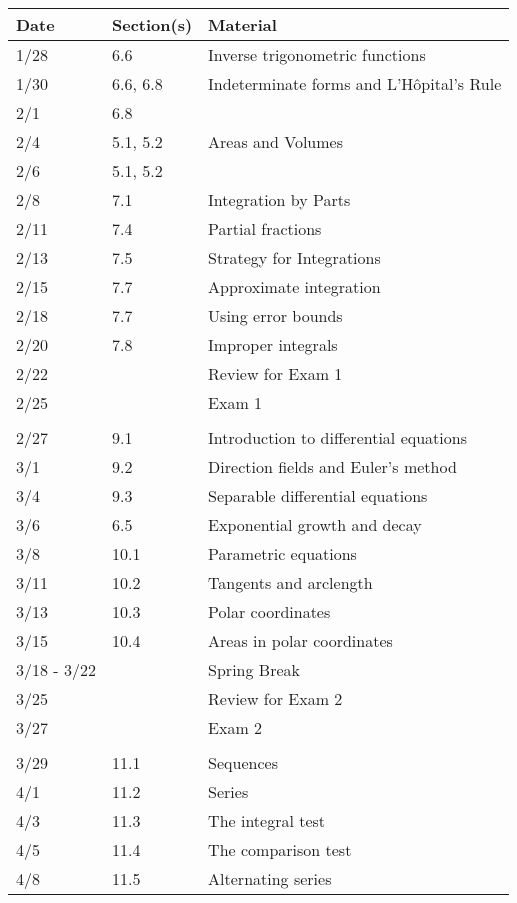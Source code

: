 \begin{center}
  \begin{longtable}{lll}
    Date & Section(s) & Material\\
    \hline
    1/28 & 6.6 & Inverse trigonometric functions\\
    1/30 & 6.6, 6.8 & Indeterminate forms and L'H\^opital's Rule\\
    2/1 & 6.8\\
    2/4 & 5.1, 5.2 & Areas and Volumes\\
    2/6 & 5.1, 5.2\\
    2/8 & 7.1 & Integration by Parts\\
    2/11 & 7.4 & Partial fractions\\
    2/13 & 7.5 & Strategy for Integrations\\
    2/15 & 7.7 & Approximate integration\\
    2/18 & 7.7 & Using error bounds\\
    2/20 & 7.8 & Improper integrals\\
    2/22 & & Review for Exam 1\\
    2/25 & & Exam 1\\
    \hline\\
    2/27 & 9.1 & Introduction to differential equations\\ 
    3/1 & 9.2 & Direction fields and Euler's method\\
    3/4 & 9.3 & Separable differential equations\\
    3/6 & 6.5 & Exponential growth and decay\\
    3/8 & 10.1 & Parametric equations\\
    3/11 & 10.2 & Tangents and arclength\\
    3/13 & 10.3 & Polar coordinates\\
    3/15 & 10.4 & Areas in polar coordinates\\
    3/18 - 3/22 & & Spring Break\\
    3/25 & & Review for Exam 2\\
    3/27 & & Exam 2\\
    \hline\\
    3/29 & 11.1 & Sequences\\
    4/1 & 11.2 & Series\\ 
    4/3 & 11.3 & The integral test\\
    4/5 & 11.4 & The comparison test\\
    4/8 & 11.5 & Alternating series\\ 

\end{longtable}
\end{center}
